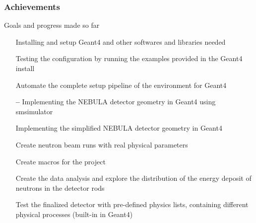 \begin{frame}
\frametitle{Achievements}

\begin{block}{Goals and progress made so far}
	\begin{itemize}
		\item[{\color{PineGreen} \checkmark}] Installing and setup Geant4 and other softwares and libraries needed
		\item[{\color{PineGreen} \checkmark}] Testing the configuration by running the examples provided in the Geant4 install
		\item[{\color{PineGreen} \checkmark}] Automate the complete setup pipeline of the environment for Geant4
		\item[{\color{red} \textbf{--}}] Implementing the NEBULA detector geometry in Geant4 using smsimulator
		\item[{\color{PineGreen} \checkmark}] Implementing the simplified NEBULA detector geometry in Geant4
		\item[{\color{PineGreen} \checkmark}] Create neutron beam runs with real physical parameters
		\item[{\color{PineGreen} \checkmark}] Create macros for the project
		\item[{\color{PineGreen} \checkmark}] Create the data analysis and explore the distribution of the energy deposit of neutrons in the detector rods
		\item[{\color{PineGreen} \checkmark}] Test the finalized detector with pre-defined physics lists, containing different physical processes (built-in in Geant4)
	\end{itemize}
\end{block}

\end{frame}
